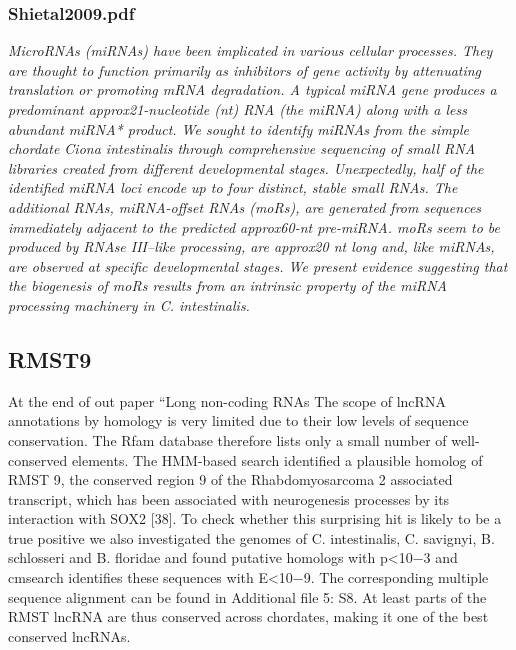 \subsubsection{Shietal2009.pdf}

\cite{Shi2009}
\textit{MicroRNAs (miRNAs) have been implicated in various cellular processes. They are thought to function primarily as inhibitors of gene activity by attenuating translation or promoting mRNA degradation. A typical miRNA gene produces a predominant approx21-nucleotide (nt) RNA (the miRNA) along with a less abundant miRNA* product. We sought to identify miRNAs from the simple chordate Ciona intestinalis through comprehensive sequencing of small RNA libraries created from different developmental stages. Unexpectedly, half of the identified miRNA loci encode up to four distinct, stable small RNAs. The additional RNAs, miRNA-offset RNAs (moRs), are generated from sequences immediately adjacent to the predicted approx60-nt pre-miRNA. moRs seem to be produced by RNAse III–like processing, are approx20 nt long and, like miRNAs, are observed at specific developmental stages. We present evidence suggesting that the biogenesis of moRs results from an intrinsic property of the miRNA processing machinery in C. intestinalis.}

\subsection{RMST9}
At the end of out paper “Long non-coding RNAs
The scope of lncRNA annotations by homology is very limited due to their low levels of sequence conservation. The Rfam database therefore lists only a small number of well-conserved elements. The HMM-based search identified a plausible homolog of RMST 9, the conserved region 9 of the Rhabdomyosarcoma 2 associated transcript, which has been associated with neurogenesis processes by its interaction with SOX2 [38]. To check whether this surprising hit is likely to be a true positive we also investigated the genomes of C. intestinalis, C. savignyi, B. schlosseri and B. floridae and found putative homologs with p<10−3 and cmsearch identifies these sequences with E<10−9. The corresponding multiple sequence alignment can be found in Additional file 5: S8. At least parts of the RMST lncRNA are thus conserved across chordates, making it one of the best conserved lncRNAs.

